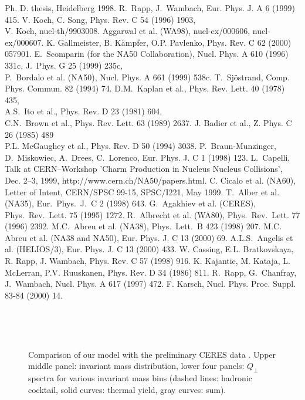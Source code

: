 \begin{thebibliography}{99}
Ph. D. thesis, Heidelberg 1998.
R.~Rapp, J.~Wambach, Eur. Phys. J. A 6 (1999) 415.
V. Koch, C. Song, Phys. Rev. C 54 (1996) 1903,\\
V. Koch, nucl-th/9903008.
Aggarwal et al. (WA98), nucl-ex/000606, nucl-ex/000607.
K. Gallmeister, B. K\"ampfer, O.P. Pavlenko, Phys. Rev. C 62 (2000) 057901.
E.~Scomparin (for the NA50 Collaboration), 
Nucl. Phys. A 610 (1996) 331c, J.~Phys. G 25 (1999) 235c,\\
P.~Bordalo et al. (NA50), Nucl. Phys. A 661 (1999) 538c.
T.~Sj\"ostrand, Comp. Phys. Commun. 82 (1994) 74.
D.M.~Kaplan et al., Phys. Rev. Lett. 40 (1978) 435,\\
A.S.~Ito et al., Phys. Rev. D 23 (1981) 604,\\
C.N.~Brown et al., Phys. Rev. Lett. 63 (1989) 2637.
J. Badier et al., Z. Phys. C 26 (1985) 489\\
P.L. McGaughey et al., Phys. Rev. D 50 (1994) 3038.
P.~Braun-Munzinger, D.~Miskowiec, A.~Drees, C.~Lorenco,
Eur. Phys. J. C 1 (1998) 123.
L.~Capelli, Talk at CERN--Workshop 
'Charm Production in Nucleus Nucleus Collisions', Dec. 2--3, 1999,
http://www.cern.ch/NA50/papers.html.
C. Cicalo et al. (NA60), Letter of Intent,
CERN/SPSC 99-15, SPSC/I221, May 1999.
T.~Alber et al. (NA35), Eur.~Phys.~J.~C 2 (1998) 643. 
G.~Agakhiev et al. (CERES), Phys.~Rev.~Lett. 75 (1995) 1272.
R.~Albrecht et al. (WA80), Phys.~Rev.~Lett. 77 (1996) 2392.
M.C.~Abreu et al. (NA38), Phys.~Lett.~B 423 (1998) 207.
M.C. Abreu et al. (NA38 and NA50),
Eur. Phys. J. C 13 (2000) 69.
A.L.S.~Angelis et al. (HELIOS/3), Eur. Phys. J. C 13 (2000) 433.
W. Cassing, E.L. Bratkovskaya, R. Rapp, J. Wambach, 
Phys. Rev. C 57 (1998) 916.
K. Kajantie, M. Kataja, L. McLerran, P.V. Ruuskanen,
Phys. Rev. D 34 (1986) 811. 
 R.~Rapp, G.~Chanfray, J.~Wambach, 
Nucl. Phys. A 617 (1997) 472.
F. Karsch, Nucl. Phys. Proc. Suppl. 83-84 (2000) 14. 
\end{thebibliography}

\newpage
\begin{figure}[t] %
\centering
~\\[-.1cm]

\hfill
{}
\hfill
{}
\hfill
{}
~\\[.5cm]
\caption{
Comparison of our model with the preliminary 
CERES data \cite{CERES_Pb}. 
Upper middle panel: invariant mass distribution,
lower four panels: $Q_\perp$ spectra for various
invariant mass bins
(dashed lines: hadronic cocktail,
solid curves: thermal yield,
gray curves: sum).
}
\label{f_1}
\end{figure}

